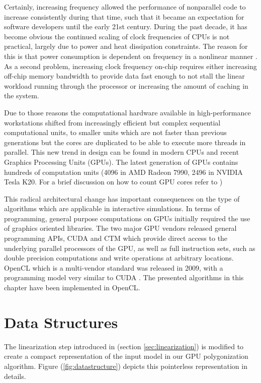 Certainly, increasing frequency allowed the performance of nonparallel code to increase consistently during that time, such that it became an 
expectation for software developers until the early 21st century. During the past decade, it has become obvious the continued scaling of clock 
frequencies of CPUs is not practical, largely due to power and heat dissipation constraints. The reason for this is that power consumption is 
dependent on frequency in a nonlinear manner \cite{gaster2012heterogeneous}. As a second problem, increasing clock frequency on-chip requires 
either increasing off-chip memory bandwidth to provide data fast enough to not stall the linear workload running through the processor or increasing
the amount of caching in the system. 

Due to those reasons the computational hardware available in high-performance workstations shifted from increasingly efficient but complex sequential 
computational units, to smaller units which are not faster than previous generations but the cores are duplicated to be able to execute more threads 
in parallel. This new trend in design can be found in modern CPUs and recent Graphics Processing Units (GPUs). The latest generation of GPUs contains 
hundreds of computation units (4096 in AMD Radeon 7990, 2496 in NVIDIA Tesla K20. For a brief discussion on how to count GPU cores refer to \cite{Fatahalian2008})

This radical architectural change has important consequences on the type of algorithms which are applicable in interactive simulations. In terms of 
programming, general purpose computations on GPUs initially required the use of graphics oriented libraries. The two major GPU vendors released general
programming APIs, CUDA \cite{Nickolls2008} and CTM \cite{peercy2006performance} which provide direct access to the underlying parallel processors of the
GPU, as well as full instruction sets, such as double precision computations and write operations at arbitrary locations. OpenCL which is a multi-vendor
standard was released in 2009, with a programming model very similar to CUDA \cite{gaster2012heterogeneous}. The presented algorithms in this chapter
have been implemented in OpenCL. 

\section{Data Structures}
\label{sec:datastructure}
The \blob linearization step introduced in (section \ref{sec:linearization}) is modified to create a compact representation of the input model in our 
GPU polygonization algorithm. Figure (\ref{fig:datastructure}) depicts this pointerless representation in details.

